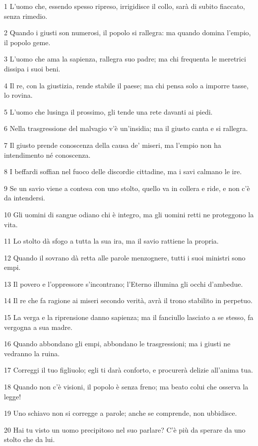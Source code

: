 \par 1 L'uomo che, essendo spesso ripreso, irrigidisce il collo, sarà di subito fiaccato, senza rimedio.
\par 2 Quando i giusti son numerosi, il popolo si rallegra: ma quando domina l'empio, il popolo geme.
\par 3 L'uomo che ama la sapienza, rallegra suo padre; ma chi frequenta le meretrici dissipa i suoi beni.
\par 4 Il re, con la giustizia, rende stabile il paese; ma chi pensa solo a imporre tasse, lo rovina.
\par 5 L'uomo che lusinga il prossimo, gli tende una rete davanti ai piedi.
\par 6 Nella trasgressione del malvagio v'è un'insidia; ma il giusto canta e si rallegra.
\par 7 Il giusto prende conoscenza della causa de' miseri, ma l'empio non ha intendimento né conoscenza.
\par 8 I beffardi soffian nel fuoco delle discordie cittadine, ma i savi calmano le ire.
\par 9 Se un savio viene a contesa con uno stolto, quello va in collera e ride, e non c'è da intendersi.
\par 10 Gli uomini di sangue odiano chi è integro, ma gli uomini retti ne proteggono la vita.
\par 11 Lo stolto dà sfogo a tutta la sua ira, ma il savio rattiene la propria.
\par 12 Quando il sovrano dà retta alle parole menzognere, tutti i suoi ministri sono empi.
\par 13 Il povero e l'oppressore s'incontrano; l'Eterno illumina gli occhi d'ambedue.
\par 14 Il re che fa ragione ai miseri secondo verità, avrà il trono stabilito in perpetuo.
\par 15 La verga e la riprensione danno sapienza; ma il fanciullo lasciato a se stesso, fa vergogna a sua madre.
\par 16 Quando abbondano gli empi, abbondano le trasgressioni; ma i giusti ne vedranno la ruina.
\par 17 Correggi il tuo figliuolo; egli ti darà conforto, e procurerà delizie all'anima tua.
\par 18 Quando non c'è visioni, il popolo è senza freno; ma beato colui che osserva la legge!
\par 19 Uno schiavo non si corregge a parole; anche se comprende, non ubbidisce.
\par 20 Hai tu visto un uomo precipitoso nel suo parlare? C'è più da sperare da uno stolto che da lui.
